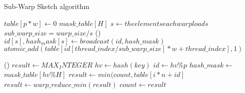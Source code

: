\documentclass[conference]{IEEEtran}
\begin{document}
\begin{algorithm}[H]
    \DontPrintSemicolon
    \caption{Sub-Warp Sketch algorithm}
    $table[p * w] \longleftarrow 0$\;
    $mask\_table[H]$\;
    $s \longleftarrow the elements each warp loads$\;
    $sub\_warp\_size = warp\_size / s $\;
\Fn(){}
{
    {
            $id[s], hash_mask[s] \leftarrow broadcast(id, hash\_mask)$\;
            {
                {
                    $atomic\_add(table[id[thread\_index / sub\_warp\_size] * w + thread\_index], 1)$
                }
            }
    }
}

\Fn(){}
{%
    {
        $result \leftarrow MAX_INTEGER$\;
            $hv \leftarrow hash(key)$\;
            $id \leftarrow hv \% p$
            $hash\_mask \leftarrow$ $mask\_table[hv \% H]$
            {
                {
                    $result \leftarrow min(count, table[i * n + id]$
                }
            }
        $result \leftarrow warp\_reduce\_min(result)$\;
        {
            $count \leftarrow result$
        }
    }
}

\end{algorithm}
\end{document}
